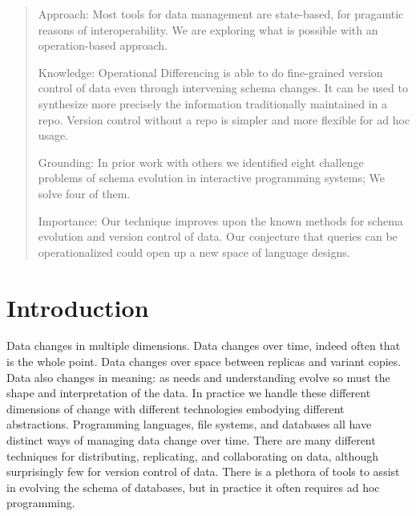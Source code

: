 \documentclass[english,submission]{programming}
\theoremstyle{definition}
\begin{document}
\begin{abstract}
Approach: Most tools for data management are state-based, for pragamtic reasons of interoperability. We are exploring what is possible with an operation-based approach.

Knowledge: Operational Differencing is able to do fine-grained version control of data even through intervening schema changes. It can be used to synthesize more precisely the information traditionally maintained in a repo. Version control without a repo is simpler and more flexible for ad hoc usage.

Grounding: In prior work with others we identified eight challenge problems of schema evolution in interactive programming systems; We solve four of them.

Importance: Our technique improves upon the known methods for schema evolution and version control of data. Our conjecture that queries can be operationalized could open up a new space of language designs.

\end{abstract}



\section{Introduction}

Data changes in multiple dimensions. Data changes over time, indeed often that is the whole point. Data changes over space between replicas and variant copies. Data also changes in meaning: as needs and understanding evolve so must the shape and interpretation of the data. In practice we handle these different dimensions of change with different technologies embodying different abstractions. Programming languages, file systems, and databases all have distinct ways of managing data change over time. There are many different techniques for distributing, replicating, and collaborating on data, although surprisingly few for version control of data. There is a plethora of tools to assist in evolving the schema of databases, but in practice it often requires ad hoc programming.
\end{document}
